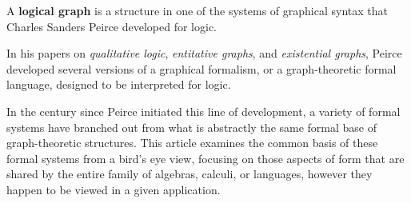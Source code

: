 \documentclass[12pt]{article}
\begin{document}

A \textbf{logical graph} is a  structure in one of the systems of graphical syntax that Charles Sanders Peirce developed for logic.

In his papers on \textit{qualitative logic}, \textit{entitative graphs}, and \textit{existential graphs}, Peirce developed several versions of a graphical formalism, or a graph-theoretic formal language, designed to be interpreted for logic.

In the century since Peirce initiated this line of development, a variety of formal systems have branched out from what is abstractly the same formal base of graph-theoretic structures.  This article examines the common basis of these formal systems from a bird's eye view, focusing on those aspects of form that are shared by the entire family of algebras, calculi, or languages, however they happen to be viewed in a given application.
\end{document}
